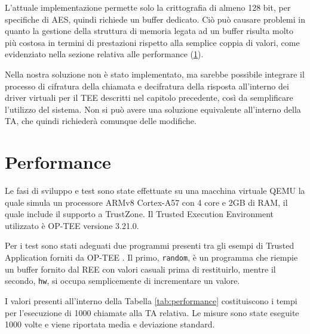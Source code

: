 \documentclass[12pt,italian]{report}
\begin{document}
	L'attuale implementazione permette solo la crittografia di almeno 128 bit, per specifiche di AES, quindi richiede un buffer dedicato. Ciò può causare problemi in quanto la gestione della struttura di memoria legata ad un buffer risulta molto più costosa in termini di prestazioni rispetto alla semplice coppia di valori, come evidenziato nella sezione relativa alle performance (\ref{sec:dati}).
	
	\bigbreak
	
	Nella nostra soluzione non è stato implementato, ma sarebbe possibile integrare il processo di cifratura della chiamata e decifratura della risposta all'interno dei driver virtuali per il TEE descritti nel capitolo precedente, così da semplificare l'utilizzo del sistema. Non si può avere una soluzione equivalente all'interno della TA, che quindi richiederà comunque delle modifiche.
	
	\newpage
	
	\section{Performance}
	\label{sec:dati}
	Le fasi di sviluppo e test sono state effettuate su una macchina virtuale QEMU la quale simula un processore ARMv8 Cortex-A57 con 4 core e 2GB di RAM, il quale include il supporto a TrustZone. Il Trusted Execution Environment utilizzato è OP-TEE versione 3.21.0.
	
	Per i test sono stati adeguati due programmi presenti tra gli esempi di Trusted Application forniti da OP-TEE \cite{optee_examples}. Il primo, \texttt{random}, è un programma che riempie un buffer fornito dal REE con valori casuali prima di restituirlo, mentre il secondo, \texttt{hw}, si occupa semplicemente di incrementare un valore.
	
	I valori presenti all'interno della Tabella \ref{tab:performance} costituiscono i tempi per l'esecuzione di 1000 chiamate alla TA relativa. Le misure sono state eseguite 1000 volte e viene riportata media e deviazione standard.  
	
\end{document}
